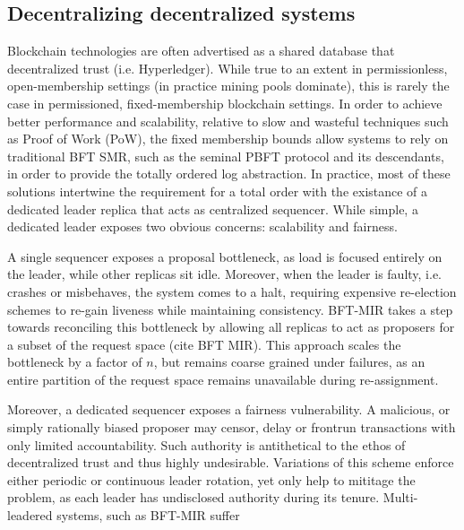 \subsection{Decentralizing decentralized systems}
Blockchain technologies are often advertised as a shared database that decentralized trust (i.e. Hyperledger). While true to an extent in permissionless, open-membership settings (in practice mining pools dominate), this is rarely the case in permissioned, fixed-membership blockchain settings. In order to achieve better performance and scalability, relative to slow and wasteful techniques such as Proof of Work (PoW), the fixed membership bounds allow systems to rely on traditional BFT SMR, such as the seminal PBFT protocol and its descendants, in order to provide the totally ordered log abstraction.
In practice, most of these solutions intertwine the requirement for a total order with the existance of a dedicated leader replica that acts as centralized sequencer. While simple,  a dedicated leader exposes two obvious concerns: scalability and fairness.

A single sequencer exposes a proposal bottleneck, as load is focused entirely on the leader, while other replicas sit idle. Moreover, when the leader is faulty, i.e. crashes or misbehaves, the system comes to a halt, requiring expensive re-election schemes to re-gain liveness while maintaining consistency. BFT-MIR takes a step towards reconciling this bottleneck by allowing all replicas to act as proposers for a subset of the request space (cite BFT MIR). This approach scales the bottleneck by a factor of $n$, but remains coarse grained under failures, as an entire partition of the request space remains unavailable during re-assignment.

Moreover, a dedicated sequencer exposes a fairness vulnerability. A malicious, or simply rationally biased proposer may censor, delay or frontrun transactions with only limited accountability. Such authority is antithetical to the ethos of decentralized trust and thus highly undesirable. Variations of this scheme enforce either periodic or continuous leader rotation, yet only help to mititage the problem, as each leader has undisclosed authority during its tenure. Multi-leadered systems, such as BFT-MIR  suffer


